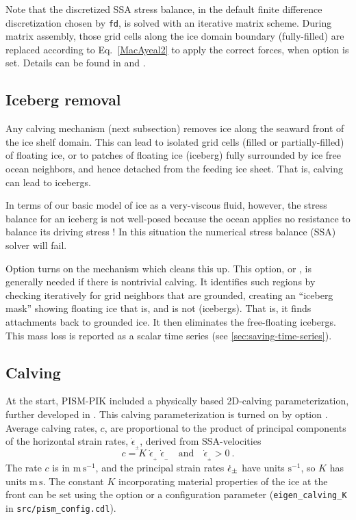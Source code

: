 Note that the discretized SSA stress balance, in the default finite difference discretization chosen by  \texttt{fd}, is solved with an iterative matrix scheme. During matrix assembly, those grid cells along the ice domain boundary (fully-filled) are replaced according to Eq.~\eqref{MacAyeal2} to apply the correct forces, when option  is set.  Details can be found in \cite{Winkelmannetal2011} and \cite{Albrechtetal2011}.  


\subsection{Iceberg removal}
\label{sec:kill-icebergs}
Any calving mechanism (next subsection) removes ice along the seaward front of the ice shelf domain.  This can lead to isolated grid cells (filled or partially-filled) of floating ice, or to patches of floating ice (iceberg) fully surrounded by ice free ocean neighbors, and hence detached from the feeding ice sheet.  That is, calving can lead to icebergs.

In terms of our basic model of ice as a very-viscous fluid, however, the stress balance for an iceberg is not well-posed because the ocean applies no resistance to balance its driving stress \cite{SchoofStream}!  In this situation the numerical stress balance (SSA) solver will fail.

Option  turns on the mechanism which cleans this up.  This option, or , is generally needed if there is nontrivial calving.  It identifies such regions by checking iteratively for grid neighbors that are grounded, creating an ``iceberg mask'' showing floating ice that is, and is not (icebergs).  That is, it finds attachments back to grounded ice.  It then eliminates the free-floating icebergs.  This mass loss is reported as a scalar time series (see \ref{sec:saving-time-series}).


\subsection{Calving}
\label{sec:calving}
At the start, PISM-PIK included a physically based 2D-calving parameterization, further developed in \cite{Levermannetal2012}. This calving parameterization is turned on by option .  Average calving rates, $c$, are proportional to the product of principal components of the horizontal strain rates, $\dot{\epsilon}_{_\pm}$, derived from SSA-velocities 
\begin{equation}
\label{eq: calv2}
c = K\; \dot{\epsilon}_{_+}\; \dot{\epsilon}_{_-}\quad\text{and}\quad\dot{\epsilon}_{_\pm}>0\:.
\end{equation}
The rate $c$ is in $\text{m}\,\text{s}^{-1}$, and the principal strain rates $\dot{\epsilon}_\pm$ have units $\text{s}^{-1}$, so $K$ has units $\text{m}\,\text{s}$.  The constant $K$ incorporating material properties of the ice at the front can be set using the  option or a configuration parameter (\texttt{eigen_calving_K} in \texttt{src/pism_config.cdl}).

